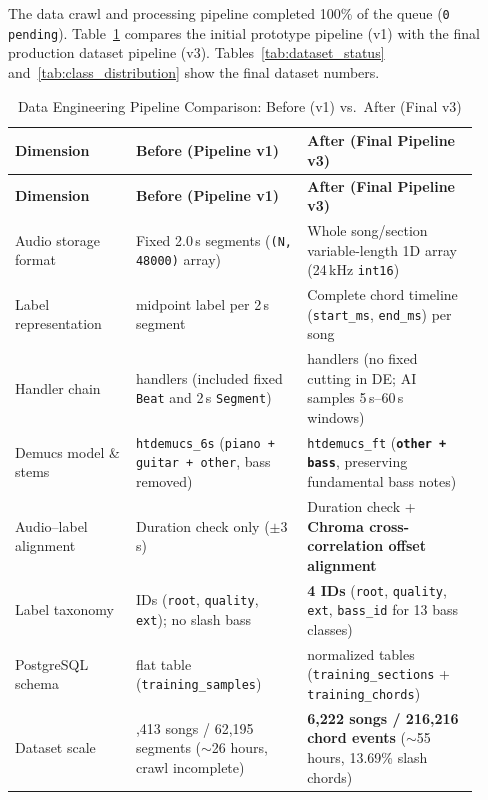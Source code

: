 \documentclass[a4paper]{article}
\begin{document}
The data crawl and processing pipeline completed 100\% of the queue (\texttt{0 pending}). Table~\ref{tab:de_before_after} compares the initial prototype pipeline (v1) with the final production dataset pipeline (v3). Tables~\ref{tab:dataset_status} and~\ref{tab:class_distribution} show the final dataset numbers.

\begin{longtable}{@{}
    >{\raggedright\arraybackslash}p{0.24\linewidth}
    >{\raggedright\arraybackslash}p{0.34\linewidth}
    >{\raggedright\arraybackslash}p{0.34\linewidth}@{}}

    \caption{Data Engineering Pipeline Comparison: Before (v1) vs.\ After (Final v3)}\label{tab:de_before_after} \\
    \toprule
    \textbf{Dimension} & \textbf{Before (Pipeline v1)} & \textbf{After (Final Pipeline v3)} \\
    \midrule
    \endfirsthead
    \toprule
    \textbf{Dimension} & \textbf{Before (Pipeline v1)} & \textbf{After (Final Pipeline v3)} \\
    \midrule
    \endhead
    \bottomrule
    \endlastfoot

    Audio storage format & Fixed 2.0\,s segments (\texttt{(N, 48000)} array) & Whole song/section variable-length 1D array (24\,kHz \texttt{int16}) \\
    \addlinespace
    Label representation & 1 midpoint label per 2\,s segment & Complete chord timeline (\texttt{start\_ms}, \texttt{end\_ms}) per song \\
    \addlinespace
    Handler chain & 7 handlers (included fixed \texttt{Beat} and 2\,s \texttt{Segment}) & 5 handlers (no fixed cutting in DE; AI samples 5\,s--60\,s windows) \\
    \addlinespace
    Demucs model \& stems & \texttt{htdemucs\_6s} (\texttt{piano + guitar + other}, bass removed) & \texttt{htdemucs\_ft} (\textbf{\texttt{other + bass}}, preserving fundamental bass notes) \\
    \addlinespace
    Audio--label alignment & Duration check only ($\pm 3$\,s) & Duration check + \textbf{Chroma cross-correlation offset alignment} \\
    \addlinespace
    Label taxonomy & 3 IDs (\texttt{root}, \texttt{quality}, \texttt{ext}); no slash bass & \textbf{4 IDs} (\texttt{root}, \texttt{quality}, \texttt{ext}, \texttt{bass\_id} for 13 bass classes) \\
    \addlinespace
    PostgreSQL schema & 1 flat table (\texttt{training\_samples}) & 2 normalized tables (\texttt{training\_sections} + \texttt{training\_chords}) \\
    \addlinespace
    Dataset scale & 3,413 songs / 62,195 segments ($\sim$26 hours, crawl incomplete) & \textbf{6,222 songs / 216,216 chord events} ($\sim$55 hours, 13.69\% slash chords) \\
\end{longtable}
\end{document}
